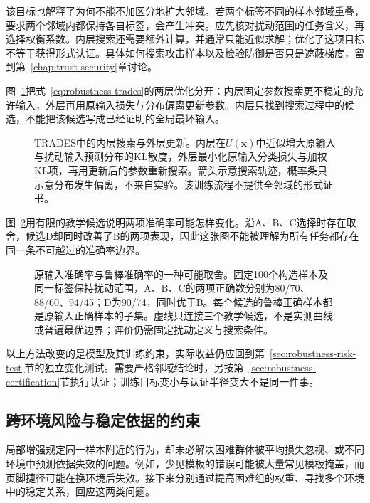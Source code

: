 该目标也解释了为何不能不加区分地扩大邻域。若两个标签不同的样本邻域重叠，要求两个邻域内都保持各自标签，会产生冲突。应先核对扰动范围的任务含义，再选择权衡系数。内层搜索还需要额外计算，并通常只能近似求解；优化了这项目标不等于获得形式认证。具体如何搜索攻击样本以及检验防御是否只是遮蔽梯度，留到第~\ref{chap:trust-security}章讨论。

图~\ref{fig:trust-adversarial-training-loops}把式~\eqref{eq:robustness-trades}的两层优化分开：内层固定参数搜索更不稳定的允许输入，外层再用原输入损失与分布偏离更新参数。内层只找到搜索过程中的候选，不能把该候选写成已经证明的全局最坏输入。

\begin{figure}[htbp]
  \centering
  
  \caption{TRADES中的内层搜索与外层更新。内层在$U(\bm x)$中近似增大原输入与扰动输入预测分布的KL散度，外层最小化原输入分类损失与加权KL项，再用更新后的参数重新搜索。箭头示意搜索轨迹，概率条只示意分布发生偏离，不来自实验。该训练流程不提供全邻域的形式证书。}
  \label{fig:trust-adversarial-training-loops}
\end{figure}

图~\ref{fig:trust-robust-accuracy-tradeoff}用有限的教学候选说明两项准确率可能怎样变化。沿A、B、C选择时存在取舍，候选D却同时改善了B的两项表现，因此这张图不能被理解为所有任务都存在同一条不可越过的准确率边界。

\begin{figure}[htbp]
  \centering
  
  \caption{原输入准确率与鲁棒准确率的一种可能取舍。固定100个构造样本及同一标签保持扰动范围，A、B、C的两项正确数分别为80/70、88/60、94/45；D为90/74，同时优于B。每个候选的鲁棒正确样本都是原输入正确样本的子集。虚线只连接三个教学候选，不是实测曲线或普遍最优边界；评价仍需固定扰动定义与搜索条件。}
  \label{fig:trust-robust-accuracy-tradeoff}
\end{figure}

以上方法改变的是模型及其训练约束，实际收益仍应回到第~\ref{sec:robustness-risk-test}节的独立变化测试。需要严格邻域结论时，另按第~\ref{sec:robustness-certification}节执行认证；训练目标变小与认证半径变大不是同一件事。

\subsection{跨环境风险与稳定依据的约束}
\label{sec:robustness-environment-enhancement}

局部增强规定同一样本附近的行为，却未必解决困难群体被平均损失忽视、或不同环境中预测依据失效的问题。例如，少见模板的错误可能被大量常见模板掩盖，而页脚捷径可能在换环境后失效。接下来分别通过提高困难组的权重、寻找多个环境中的稳定关系，回应这两类问题。

